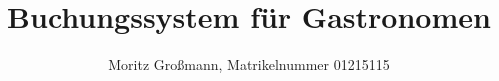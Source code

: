 


	
	\title{Buchungssystem für Gastronomen}
	\author{Moritz Großmann, Matrikelnummer 01215115}
	\maketitle
	
	
	
	
	
	
	
	
	
	
	
	
	
